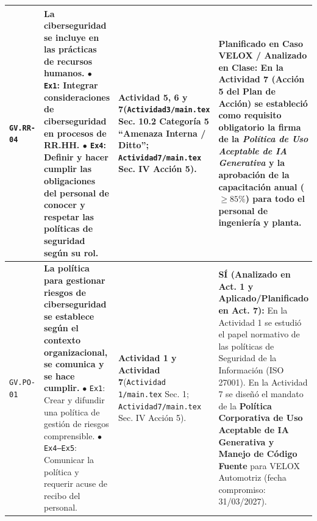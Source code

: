 \documentclass[letterpaper,11pt]{article}
\begin{document}
\begin{longtable}{|C{1.5cm}|L{5.3cm}|L{4.3cm}|L{5.8cm}|}
\texttt{GV.RR-04} &
\textbf{La ciberseguridad se incluye en las prácticas de recursos humanos.}\newline
$\bullet$ \texttt{Ex1}: Integrar consideraciones de ciberseguridad en procesos de RR.HH.\newline
$\bullet$ \texttt{Ex4}: Definir y hacer cumplir las obligaciones del personal de conocer y respetar las políticas de seguridad según su rol. &
\textbf{Actividad 5, 6 y 7}\newline (\texttt{Actividad3/main.tex} Sec. 10.2 Categoría 5 ``Amenaza Interna / Ditto''; \texttt{Actividad7/main.tex} Sec. IV Acción 5). &
\textbf{Planificado en Caso VELOX / Analizado en Clase:}\newline
En la Actividad 7 (Acción 5 del Plan de Acción) se estableció como requisito obligatorio la firma de la \textit{Política de Uso Aceptable de IA Generativa} y la aprobación de la capacitación anual ($\ge 85\%$) para todo el personal de ingeniería y planta. \\
\hline

\texttt{GV.PO-01} &
\textbf{La política para gestionar riesgos de ciberseguridad se establece según el contexto organizacional, se comunica y se hace cumplir.}\newline
$\bullet$ \texttt{Ex1}: Crear y difundir una política de gestión de riesgos comprensible.\newline
$\bullet$ \texttt{Ex4--Ex5}: Comunicar la política y requerir acuse de recibo del personal. &
\textbf{Actividad 1 y Actividad 7}\newline (\texttt{Actividad 1/main.tex} Sec. 1; \texttt{Actividad7/main.tex} Sec. IV Acción 5). &
\textbf{SÍ (Analizado en Act. 1 y Aplicado/Planificado en Act. 7):}\newline
En la Actividad 1 se estudió el papel normativo de las políticas de Seguridad de la Información (ISO 27001). En la Actividad 7 se diseñó el mandato de la \textbf{Política Corporativa de Uso Aceptable de IA Generativa y Manejo de Código Fuente} para VELOX Automotriz (fecha compromiso: 31/03/2027). \\
\hline


\end{longtable}
\end{document}
